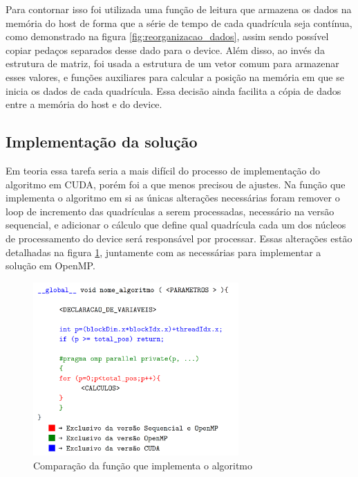 Para contornar isso foi utilizada uma função de leitura que armazena os dados na memória do host de forma que a série de tempo de cada quadrícula seja contínua, como demonstrado na figura \ref{fig:reorganizacao_dados}, assim sendo possível copiar pedaços separados desse dado para o device. Além disso, ao invés da estrutura de matriz, foi usada a estrutura de um vetor comum para armazenar esses valores, e funções auxiliares para calcular a posição na memória em que se inicia os dados de cada quadrícula. Essa decisão ainda facilita a cópia de dados entre a memória do host e do device.

\subsection{Implementação da solução}\label{cap:implementacao_solucao}

Em teoria essa tarefa seria a mais difícil do processo de implementação do algoritmo em CUDA, porém foi a que menos precisou de ajustes. Na função que implementa o algoritmo em si as únicas alterações necessárias foram remover o loop de incremento das quadrículas a serem processadas, necessário na versão sequencial, e adicionar o cálculo que define qual quadrícula cada um dos núcleos de processamento do device será responsável por processar. Essas alterações estão detalhadas na figura \ref{fig:comparacao_codigo_padrao}, juntamente com as necessárias para implementar a solução em OpenMP.

\begin{figure}[H]
\centering
\includegraphics[width=0.7\textwidth]{Imagens/comparacao_codigo/comparacao_codigo_padrao.png}
\caption{Comparação da função que implementa o algoritmo}
\label{fig:comparacao_codigo_padrao}
\end{figure}

